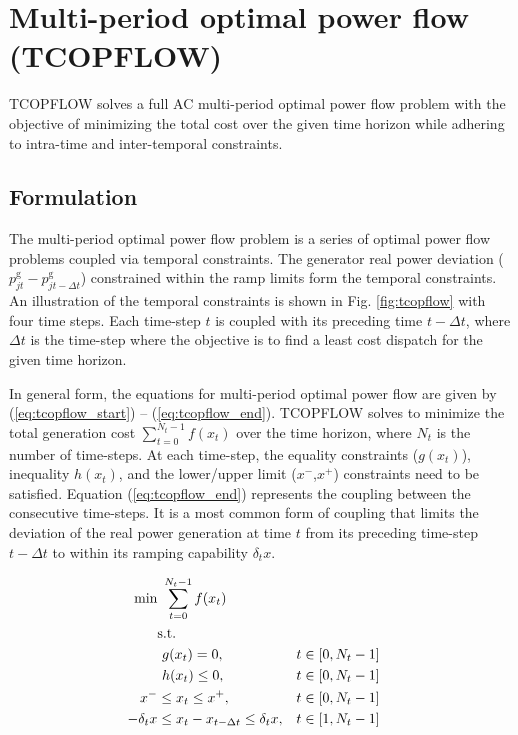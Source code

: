 \chapter{Multi-period optimal power flow (TCOPFLOW)}\label{chap:tcopflow}

TCOPFLOW solves a full AC multi-period optimal power flow problem with the objective of minimizing the total cost over the given time horizon while adhering to intra-time and inter-temporal constraints. 

\section{Formulation}
The multi-period optimal power flow problem is a series of optimal power flow problems coupled via temporal constraints. The generator real power deviation ($p_{jt}^{\text{g}} - p_{jt-\Delta{t}}^{\text{g}}$) constrained within the ramp limits form the temporal constraints. An illustration of the temporal constraints is shown in Fig. \ref{fig:tcopflow} with four time steps. Each time-step $t$ is coupled with its preceding time $t-\Delta{t}$, where $\Delta{t}$ is the time-step where the objective is to find a least cost dispatch for the given time horizon.



In general form, the equations for multi-period optimal power flow are given by
(\ref{eq:tcopflow_start}) -- (\ref{eq:tcopflow_end}). TCOPFLOW solves to minimize the total generation cost $\sum_{t=0}^{N_t-1}f(x_t)$ over the time horizon, where $N_t$ is the number of time-steps. At each time-step, the equality constraints ($g(x_t)$), inequality $h(x_t)$, and the lower/upper limit ($x^-$,$x^+$) constraints need to be satisfied. Equation (\ref{eq:tcopflow_end}) represents the coupling between the consecutive time-steps. It is a most common form of coupling that limits the deviation of the real power generation at time $t$ from its preceding time-step $t-\Delta{t}$ to within its ramping capability $\delta_t{x}$.


\begin{align}
\centering
\text{min}&~\sum_{t=0}^{N_t-1} f(x_t) &  \label{eq:tcopflow_start}\\
&\text{s.t.}& \nonumber \\
&~g(x_t) = 0,                                        &t \in \left[0,N_t-1\right]& \\
&~h(x_t) \le 0,                                      &t \in \left[0,N_t-1\right]& \\
x^- & \le x_t \le x^+,                               &t\in \left[0,N_t-1\right]& \\
-\delta_t{x} & \le x_t - x_{t-\Delta{t}} \le \delta_t{x},&t \in \left[1,N_t-1\right]&
\label{eq:tcopflow_end}
\end{align}

